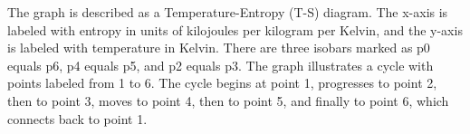 The graph is described as a Temperature-Entropy (T-S) diagram. The x-axis is labeled with entropy in units of kilojoules per kilogram per Kelvin, and the y-axis is labeled with temperature in Kelvin. There are three isobars marked as p0 equals p6, p4 equals p5, and p2 equals p3. The graph illustrates a cycle with points labeled from 1 to 6. The cycle begins at point 1, progresses to point 2, then to point 3, moves to point 4, then to point 5, and finally to point 6, which connects back to point 1.